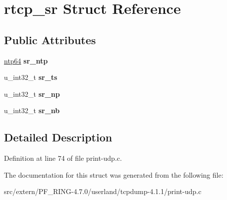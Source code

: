 \hypertarget{structrtcp__sr}{
\section{rtcp\_\-sr Struct Reference}
\label{structrtcp__sr}
}
\subsection*{Public Attributes}
\begin{DoxyCompactItemize}
\item 
\hypertarget{structrtcp__sr_a8d5f2a30f204832f6d2ce3f50742fcb8}{
\hyperlink{structntp64}{ntp64} {\bfseries sr\_\-ntp}}
\label{structrtcp__sr_a8d5f2a30f204832f6d2ce3f50742fcb8}

\item 
\hypertarget{structrtcp__sr_ab17fb88ec810c25e216c6bc403f0d900}{
u\_\-int32\_\-t {\bfseries sr\_\-ts}}
\label{structrtcp__sr_ab17fb88ec810c25e216c6bc403f0d900}

\item 
\hypertarget{structrtcp__sr_a65ae2f3b7a00f7b5999b6689ff86a06f}{
u\_\-int32\_\-t {\bfseries sr\_\-np}}
\label{structrtcp__sr_a65ae2f3b7a00f7b5999b6689ff86a06f}

\item 
\hypertarget{structrtcp__sr_a6c417d33d1209bdb8760dc429ad95695}{
u\_\-int32\_\-t {\bfseries sr\_\-nb}}
\label{structrtcp__sr_a6c417d33d1209bdb8760dc429ad95695}

\end{DoxyCompactItemize}


\subsection{Detailed Description}


Definition at line 74 of file print-\/udp.c.



The documentation for this struct was generated from the following file:\begin{DoxyCompactItemize}
\item 
src/extern/PF\_\-RING-\/4.7.0/userland/tcpdump-\/4.1.1/print-\/udp.c\end{DoxyCompactItemize}
